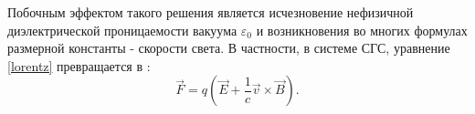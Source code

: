 Побочным эффектом такого решения является исчезновение нефизичной диэлектрической проницаемости вакуума $\varepsilon_0$ и возникновения во многих формулах
размерной константы - скорости света. В частности, в системе СГС, уравнение \eqref{lorentz} превращается в :
\begin{equation*}
	\vec{F} = q \left( \vec{E} + \frac{1}{c}\vec{v} \times \vec{B} \right).
\end{equation*}